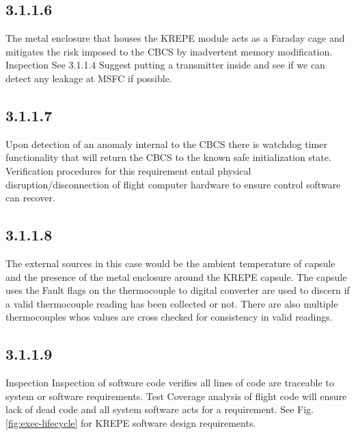 \documentclass{article}
\begin{document}
\subsection{3.1.1.6}
The metal enclosure that houses the KREPE module acts as a Faraday cage and mitigates the risk imposed to the CBCS by inadvertent memory modification.
Inspection
See 3.1.1.4
Suggest putting a transmitter inside and see if we can detect any leakage at MSFC if possible.
\subsection{3.1.1.7}
Upon detection of an anomaly internal to the CBCS there is watchdog timer functionality that will return the CBCS to the known safe initialization state. Verification procedures for this requirement entail physical disruption/disconnection of flight computer hardware to ensure control software can recover.

\subsection{3.1.1.8}
The external sources in this case would be the ambient temperature of capsule and the presence of the metal enclosure around the KREPE capsule. The capsule uses the Fault flags on the thermocouple to digital converter are used to discern if a valid thermocouple reading has been collected or not. There are also multiple thermocouples whos values are cross checked for consistency in valid readings.


\subsection{3.1.1.9}
Inspection
Inspection of software code verifies all lines of code are traceable to system or software requirements.
Test
Coverage analysis of flight code will ensure lack of dead code and all system software acts for a requirement.
See Fig. \ref{fig:exec-lifecycle} for KREPE software design requirements.
\end{document}
